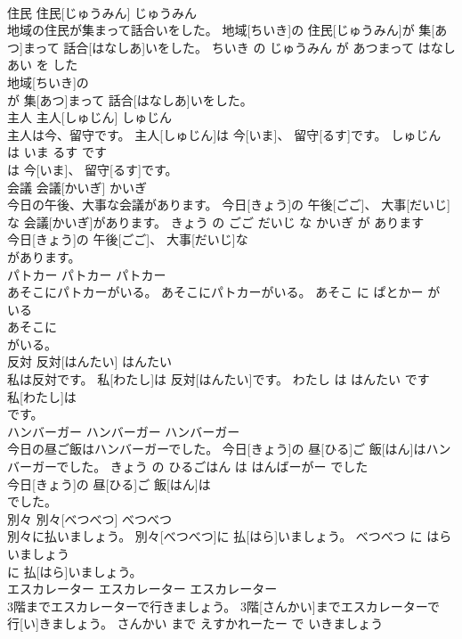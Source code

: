 \documentclass[8pt]{extreport}
\begin{document}
\begin{CJK}{UTF8}{min}
\\	住民	住民[じゅうみん]	じゅうみん	
\\	地域の住民が集まって話合いをした。	地域[ちいき]の 住民[じゅうみん]が 集[あつ]まって 話合[はなしあ]いをした。	ちいき の じゅうみん が あつまって はなしあい を した	
\\	地域[ちいき]の
\\	が 集[あつ]まって 話合[はなしあ]いをした。			
\\	主人	主人[しゅじん]	しゅじん	
\\	主人は今、留守です。	主人[しゅじん]は 今[いま]、 留守[るす]です。	しゅじん は いま るす です	
\\	は 今[いま]、 留守[るす]です。			
\\	会議	会議[かいぎ]	かいぎ	
\\	今日の午後、大事な会議があります。	今日[きょう]の 午後[ごご]、 大事[だいじ]な 会議[かいぎ]があります。	きょう の ごご だいじ な かいぎ が あります	
\\	今日[きょう]の 午後[ごご]、 大事[だいじ]な
\\	があります。			
\\	パトカー	パトカー	パトカー	
\\	あそこにパトカーがいる。	あそこにパトカーがいる。	あそこ に ぱとかー が いる	
\\	あそこに
\\	がいる。			
\\	反対	反対[はんたい]	はんたい	
\\	私は反対です。	私[わたし]は 反対[はんたい]です。	わたし は はんたい です	
\\	私[わたし]は
\\	です。			
\\	ハンバーガー	ハンバーガー	ハンバーガー	
\\	今日の昼ご飯はハンバーガーでした。	今日[きょう]の 昼[ひる]ご 飯[はん]はハンバーガーでした。	きょう の ひるごはん は はんばーがー でした	
\\	今日[きょう]の 昼[ひる]ご 飯[はん]は
\\	でした。			
\\	別々	別々[べつべつ]	べつべつ	
\\	別々に払いましょう。	別々[べつべつ]に 払[はら]いましょう。	べつべつ に はらいましょう	
\\	に 払[はら]いましょう。			
\\	エスカレーター	エスカレーター	エスカレーター	
\\	3階までエスカレーターで行きましょう。	3階[さんかい]までエスカレーターで 行[い]きましょう。	さんかい まで えすかれーたー で いきましょう	

\end{CJK}
\end{document}
